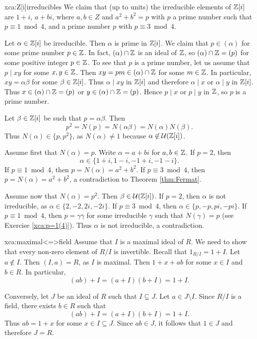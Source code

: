 \begin{sol}{xca:Z[i]irreducibles}
    We claim that (up to units) the irreducible
    elements of $\mathbb{Z}[i]$ are $1+i$, $a+bi$, where 
    $a,b\in Z$ and $a^2+b^2=p$ with $p$ a prime number
    such that $p\equiv1\bmod 4$, and a prime number $p$ with 
    $p\equiv3\bmod 4$.
    
    Let $\alpha\in\mathbb{Z}[i]$ be irreducible. Then $\alpha$ is
    prime in $\mathbb{Z}[i]$. We claim that $p\in (\alpha)$ for some
    prime number $p\in\mathbb{Z}$. In fact, 
    $(\alpha)\cap\mathbb{Z}$ is an ideal of $\mathbb{Z}$, so 
    $(\alpha)\cap\mathbb{Z}=(p)$ for some positive integer $p\in\mathbb{Z}$. 
    To see that $p$ is a prime number, let 
    us assume that $p\mid xy$ for some $x,y\in\mathbb{Z}$. Then 
    $xy=pm\in (\alpha)\cap\mathbb{Z}$ for some $m\in\mathbb{Z}$. In particular, 
    $xy=\alpha\beta$ for some $\beta\in\mathbb{Z}[i]$. Thus $\alpha\mid xy$
    in $\mathbb{Z}[i]$ and therefore 
    $\alpha\mid x$ or $\alpha\mid y$ in $\mathbb{Z}[i]$. Thus 
    $x\in (\alpha)\cap\mathbb{Z}=(p)$ or $y\in(\alpha)\cap\mathbb{Z}=(p)$. Hence
    $p\mid x$ or $p\mid y$ in $\mathbb{Z}$, so $p$ is a prime number. 

    Let $\beta\in\mathbb{Z}[i]$ be such that $p=\alpha\beta$. 
    Then 
    \[
    p^2=N(p)=N(\alpha\beta)=N(\alpha)N(\beta).
    \]
    Thus $N(\alpha)\in\{p,p^2\}$, 
    as $N(\alpha)\ne1$ because $\alpha\not\in\mathcal{U}(\mathbb{Z}[i])$. 
    
    Assume first that $N(\alpha)=p$. Write $\alpha=a+bi$ 
    for $a,b\in\mathbb{Z}$. If $p=2$, then 
    \[
    \alpha\in\{1+i,1-i,-1+i,-1-i\}.
    \]
    If $p\equiv1\bmod 4$, 
    then $p=N(\alpha)=a^2+b^2$. If $p\equiv3\bmod 4$, 
    then $p=N(\alpha)=a^2+b^2$, a contradiction to Theorem \ref{thm:Fermat}. 
    
    Assume now that $N(\alpha)=p^2$. Then $\beta\in\mathcal{U}(\mathbb{Z}[i])$.
    If $p=2$, 
    then $\alpha$ is not irreducible, as 
    $\alpha\in\{2,-2,2i,-2i\}$. 
    If $p\equiv3\bmod 4$, then $\alpha\in\{p,-p,pi,-pi\}$.  If $p\equiv1\bmod 4$, then 
    $p=\gamma\overline{\gamma}$ for some irreducible 
    $\gamma$ 
    such that $N(\gamma)=p$ (see Exercise \ref{xca:p=1(4)}). 
    Thus $\alpha$ is not irreducible, 
    a contradiction. 
\end{sol}   


\begin{sol}{xca:maximal<=>field}
    Assume that $I$ is a maximal ideal of $R$. 
    We need to show that every non-zero element of $R/I$ 
    is invertible. Recall 
    that $1_{R/I}=1+I$. 
    Let $a\not\in I$. Then $(I,a)=R$, as
    $I$ is maximal. Then $1+x+ab$ for some $x\in I$ and $b\in R$.
    In particular, 
    \[
    (ab)+I=(a+I)(b+I)=1+I.
    \]
    
    Conversely, let $J$ be an ideal of $R$ 
    such that $I\subsetneq J$. Let $a\in J\setminus I$. 
    Since $R/I$ is a field, there exists $b\in R$ such that
    \[
    (ab)+I=(a+I)(b+I)=1+I.
    \]
    Thus $ab=1+x$ for some $x\in I\subseteq J$. Since $ab\in J$, 
    it follows that $1\in J$ and therefore $J=R$. 
\end{sol}

